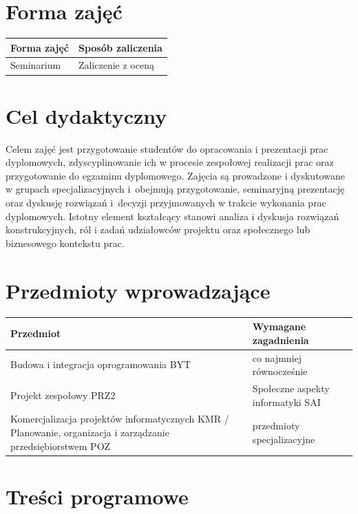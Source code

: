 \documentclass[12pt, a4paper]{article}
\begin{document}
\section{Forma zajęć}

\begin{tabular}{ll}
  \hline
  \textbf{Forma zajęć} & \textbf{Sposób zaliczenia} \\
  \hline
  Seminarium & Zaliczenie z oceną \\
  \hline
\end{tabular}

\section{Cel dydaktyczny}

Celem zajęć jest przygotowanie studentów do opracowania i prezentacji prac dyplomowych, zdyscyplinowanie ich w procesie zespołowej realizacji prac oraz przygotowanie do egzaminu dyplomowego. Zajęcia są prowadzone i dyskutowane w grupach specjalizacyjnych i obejmują przygotowanie, seminaryjną prezentację oraz dyskusję rozwiązań i decyzji przyjmowanych w trakcie wykonania prac dyplomowych. Istotny element kształcący stanowi analiza i dyskusja rozwiązań konstrukcyjnych, ról i zadań udziałowców projektu oraz społecznego lub biznesowego kontekstu prac.

\section{Przedmioty wprowadzające}

\begin{tabularx}{\textwidth}{lX}
  \hline
  \textbf{Przedmiot} & \textbf{Wymagane zagadnienia} \\
  \hline
  Budowa i integracja oprogramowania BYT & co najmniej równocześnie \\
  Projekt zespołowy PRZ2 & Społeczne aspekty informatyki SAI \\
  Komercjalizacja projektów informatycznych KMR / Planowanie, organizacja i zarządzanie przedsiębiorstwem POZ & przedmioty specjalizacyjne \\
  \hline
\end{tabularx}

\section{Treści programowe}
\end{document}
